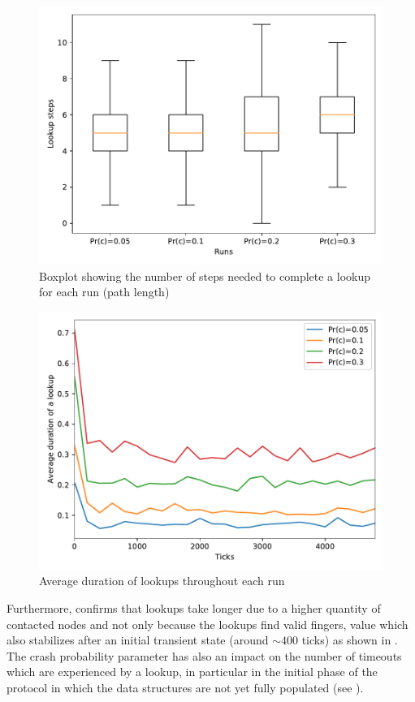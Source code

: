 \documentclass[11pt,twocolumn,letterpaper]{article}
\begin{document}
		\begin{figure}[!h]
			\centering
			\includegraphics[width=\linewidth,clip,trim=0 0.5cm 0 0.35cm]{figures/analysis1/lookuplength_box.pdf}
			\caption{Boxplot showing the number of steps needed to complete a lookup for each run (path length)}
			\label{fig:crash1}
		\end{figure}
		\begin{figure}[!h]
			\centering
			\includegraphics[width=\linewidth,clip,trim=0 0.5cm 0 0.35cm]{figures/analysis1/lookupduration_time.pdf}
			\caption{Average duration of lookups throughout each run}
			\label{fig:crash2}
		\end{figure}

		Furthermore,  confirms that lookups take longer due to a higher quantity of contacted nodes and not only because the lookups find valid fingers, value which also stabilizes after an initial transient state (around $\sim400$ ticks) as shown in . The crash probability parameter has also an impact on the number of timeouts which are experienced by a lookup, in particular in the initial phase of the protocol in which the data structures are not yet fully populated (see ). 
\end{document}
